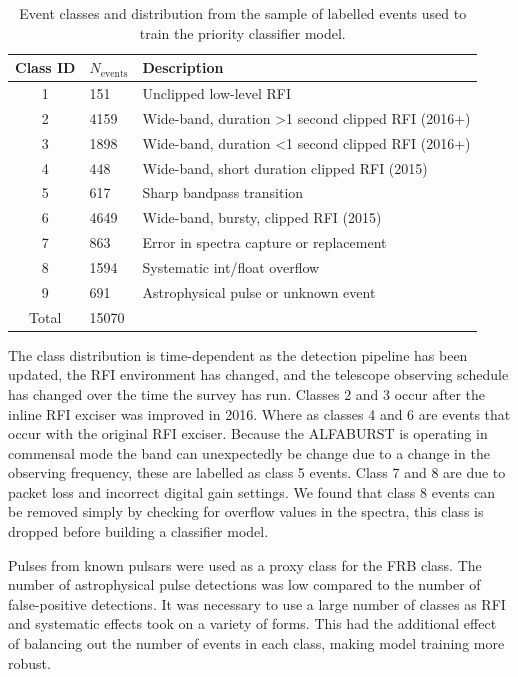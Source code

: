 \documentclass[a4paper,fleqn,usenatbib]{mnras}
\begin{document}
\begin{table}
\centering
\begin{tabularx}{\linewidth}{clX}
\hline
Class ID & $N_{\textrm{events}}$ & Description                                     \\
\hline
1        & 151     & Unclipped low-level RFI                                       \\
2        & 4159    & Wide-band, duration \textgreater 1 second clipped RFI (2016+) \\
3        & 1898    & Wide-band, duration \textless 1 second clipped RFI (2016+)    \\
4        & 448     & Wide-band, short duration clipped RFI (2015)                  \\
5        & 617     & Sharp bandpass transition                                     \\
6        & 4649    & Wide-band, bursty, clipped RFI (2015)                         \\
7        & 863     & Error in spectra capture or replacement                       \\
8        & 1594    & Systematic int/float overflow                                 \\
9        & 691     & Astrophysical pulse or unknown event                          \\
\hline
Total    & 15070   &                                                              
\end{tabularx}
\caption{Event classes and distribution from the sample of labelled events used
to train the priority classifier model.}
\label{tbl:event_classes}
\end{table}

The class distribution is time-dependent as the detection pipeline has been
updated, the RFI environment has changed, and the telescope observing schedule
has changed over the time the survey has run. Classes 2 and 3 occur after the
inline RFI exciser was improved in 2016. Where as classes 4 and 6 are events
that occur with the original RFI exciser. Because the ALFABURST is operating in
commensal mode the band can unexpectedly be change due to a change in the
observing frequency, these are labelled as class 5 events. Class 7 and 8 are due
to packet loss and incorrect digital gain settings. We found that class 8 events
can be removed simply by checking for overflow values in the spectra, this class
is dropped before building a classifier model.

Pulses from known pulsars were used as a proxy class for the FRB class. The
number of astrophysical pulse detections was low compared to the number of
false-positive detections. It was necessary to use a large number of classes
as RFI and systematic effects took on a variety of forms.  This had the
additional effect of balancing out the number of events in each class, making
model training more robust.
\end{document}

